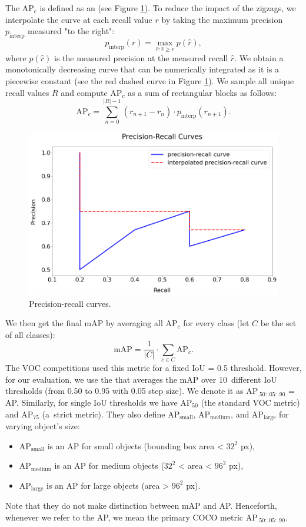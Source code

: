The AP$_c$ is defined as an  (see Figure \ref{fig:precisionrecall}). To reduce the impact of the zigzags, we interpolate the curve at each recall value $r$ by taking the maximum precision $p_\text{interp}$ measured "to the right":
$$
p_\text{interp}(r) = \max\limits_{\hat{r}:\hat{r} \geq r} p(\hat{r}),
$$
where $p(\hat{r})$ is the measured precision at the measured recall $\hat{r}$. We obtain a monotonically decreasing curve that can be numerically integrated as it is a piecewise constant (see the red dashed curve in Figure \ref{fig:precisionrecall}). We sample all unique recall values $R$ and compute AP$_c$ as a sum of rectangular blocks as follows:
$$
\text{AP}_c = \sum\limits^{\lvert R\rvert - 1}_{n = 0} (r_{n+1} - r_n) \cdot p_\text{interp}(r_{n+1}).
$$

\begin{figure}[H]
    \centering
    \includegraphics[width=0.8\linewidth]{Sources/Figures/precisionrecall.png}
    \caption{Precision-recall curves.}
    \label{fig:precisionrecall}
\end{figure}

We then get the final mAP by averaging all AP$_c$ for every class (let $C$ be the set of all classes):
$$
    \text{mAP} = \frac{1}{\lvert C \rvert} \cdot \sum_{ c\in C} \text{AP}_c.
$$
The VOC competitions \cite{voc} used this metric for a fixed IoU = 0.5 threshold. However, for our evaluation, we use the  \cite{coco} that averages the mAP over 10~different IoU thresholds (from 0.50 to 0.95 with 0.05 step size). We denote it as AP$_{.50:.05:.90}$ = AP. Similarly, for single IoU thresholds we have AP$_{50}$ (the standard VOC metric) and AP$_{75}$ (a~strict metric). They also define AP$_\text{small}$, AP$_\text{medium}$, and AP$_\text{large}$ for varying object's size:
\begin{itemize}
    \item AP$_\text{small}$ is an AP for small objects (bounding box area < $32^2$ px),
    \item AP$_\text{medium}$ is an AP for medium objects ($32^2$ < area < $96^2$ px),
    \item AP$_\text{large}$ is an AP for large objects (area > $96^2$ px).
\end{itemize}
Note that they do not make distinction between mAP and AP. Henceforth, whenever we refer to the AP, we mean the primary COCO metric AP$_{.50:.05:.90}$. 

